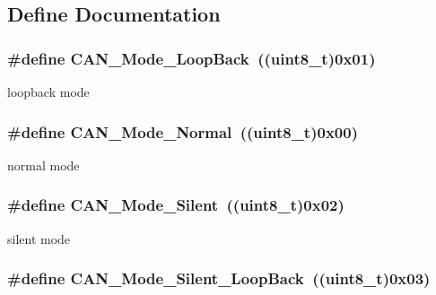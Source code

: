 \subsection{Define Documentation}
\hypertarget{group__CAN__Mode_gaad036c944403186eb3496ff65020c0ee}{
\subsubsection[{CAN\_\-Mode\_\-LoopBack}]{\setlength{\rightskip}{0pt plus 5cm}\#define CAN\_\-Mode\_\-LoopBack~((uint8\_\-t)0x01)}}
\label{group__CAN__Mode_gaad036c944403186eb3496ff65020c0ee}
loopback mode \hypertarget{group__CAN__Mode_gaaf1f48ab4917ccfd5fd31dd781d59e29}{
\subsubsection[{CAN\_\-Mode\_\-Normal}]{\setlength{\rightskip}{0pt plus 5cm}\#define CAN\_\-Mode\_\-Normal~((uint8\_\-t)0x00)}}
\label{group__CAN__Mode_gaaf1f48ab4917ccfd5fd31dd781d59e29}
normal mode \hypertarget{group__CAN__Mode_gac05e5d666f18eb35e8da70e6e17e8fb8}{
\subsubsection[{CAN\_\-Mode\_\-Silent}]{\setlength{\rightskip}{0pt plus 5cm}\#define CAN\_\-Mode\_\-Silent~((uint8\_\-t)0x02)}}
\label{group__CAN__Mode_gac05e5d666f18eb35e8da70e6e17e8fb8}
silent mode \hypertarget{group__CAN__Mode_ga087afa0d24d2cf399225993573c984eb}{
\subsubsection[{CAN\_\-Mode\_\-Silent\_\-LoopBack}]{\setlength{\rightskip}{0pt plus 5cm}\#define CAN\_\-Mode\_\-Silent\_\-LoopBack~((uint8\_\-t)0x03)}}
\label{group__CAN__Mode_ga087afa0d24d2cf399225993573c984eb}
